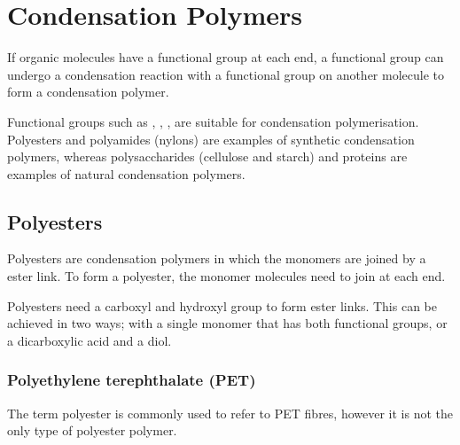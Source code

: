 \section{Condensation Polymers}

	If organic molecules have a functional group at each end, a functional group can undergo a condensation reaction with a functional group on another molecule to form a condensation polymer.

	Functional groups such as , , ,  are suitable for condensation polymerisation. Polyesters and polyamides (nylons) are examples of synthetic condensation polymers, whereas polysaccharides (cellulose and starch) and proteins are examples of natural condensation polymers.

	\subsection{Polyesters}
	
		Polyesters are condensation polymers in which the monomers are joined by a ester link. To form a polyester, the monomer molecules need to join at each end.

		\begin{center}
		\end{center}

		Polyesters need a carboxyl and hydroxyl group to form ester links. This can be achieved in two ways; with a single monomer that has both functional groups, or a dicarboxylic acid and a diol.

		\begin{center}
		\end{center}

		\begin{center}
			\qquad
		\end{center}

		\subsubsection{Polyethylene terephthalate (PET)}
		
			The term polyester is commonly used to refer to PET fibres, however it is not the only type of polyester polymer.

